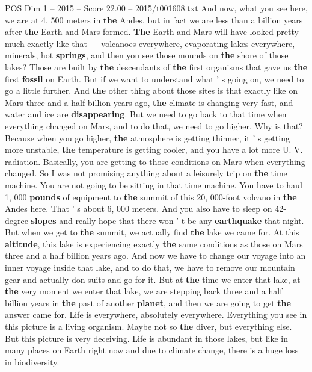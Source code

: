 \begin{textsample}{POS Dim 1 – 2015 – Score 22.00 – 2015/t001608.txt}
And now, what you see here, we are at 4, 500 meters in \textbf{the} Andes, but in fact we are less than a billion years after \textbf{the} Earth and Mars formed. \textbf{The} Earth and Mars will have looked pretty much exactly like that — volcanoes everywhere, evaporating lakes everywhere, minerals, hot \textbf{springs}, and then you see those mounds on \textbf{the} shore of those lakes?
Those are built by \textbf{the} descendants of \textbf{the} first organisms that gave us \textbf{the} first \textbf{fossil} on Earth.
But if we want to understand what ' s going on, we need to go a little further.
And \textbf{the} other thing about those sites is that exactly like on Mars three and a half billion years ago, \textbf{the} climate is changing very fast, and water and ice are \textbf{disappearing}.
But we need to go back to that time when everything changed on Mars, and to do that, we need to go higher.
Why is that?
Because when you go higher, \textbf{the} atmosphere is getting thinner, it ' s getting more unstable, \textbf{the} temperature is getting cooler, and you have a lot more U.
V. radiation.
Basically, you are getting to those conditions on Mars when everything changed.
So I was not promising anything about a leisurely trip on \textbf{the} time machine.
You are not going to be sitting in that time machine.
You have to haul 1, 000 \textbf{pounds} of equipment to \textbf{the} summit of this 20, 000-foot volcano in \textbf{the} Andes here.
That ' s about 6, 000 meters.
And you also have to sleep on 42-degree \textbf{slopes} and really hope that there won ' t be any \textbf{earthquake} that night.
But when we get to \textbf{the} summit, we actually find \textbf{the} lake we came for.
At this \textbf{altitude}, this lake is experiencing exactly \textbf{the} same conditions as those on Mars three and a half billion years ago.
And now we have to change our voyage into an inner voyage inside that lake, and to do that, we have to remove our mountain gear and actually don suits and go for it.
But at \textbf{the} time we enter that lake, at \textbf{the} very moment we enter that lake, we are stepping back three and a half billion years in \textbf{the} past of another \textbf{planet}, and then we are going to get \textbf{the} answer came for.
Life is everywhere, absolutely everywhere.
Everything you see in this picture is a living organism.
Maybe not so \textbf{the} diver, but everything else.
But this picture is very deceiving.
Life is abundant in those lakes, but like in many places on Earth right now and due to climate change, there is a huge loss in biodiversity.

\end{textsample}
